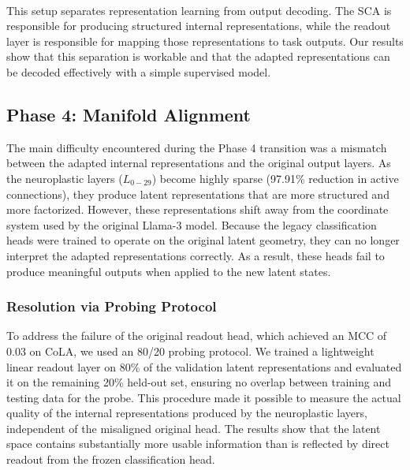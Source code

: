 \documentclass[11pt, letterpaper]{article}
\begin{document}
\paragraph{}
This setup separates representation learning from output decoding. The SCA is responsible for producing structured internal representations, while the readout layer is responsible for mapping those representations to task outputs. Our results show that this separation is workable and that the adapted representations can be decoded effectively with a simple supervised model.

\subsection{Phase 4: Manifold Alignment}
The main difficulty encountered during the Phase 4 transition was a mismatch between the adapted internal representations and the original output layers. As the neuroplastic layers ($L_{0-29}$) become highly sparse (97.91\% reduction in active connections), they produce latent representations that are more structured and more factorized. However, these representations shift away from the coordinate system used by the original Llama-3 model.
Because the legacy classification heads were trained to operate on the original latent geometry, they can no longer interpret the adapted representations correctly. As a result, these heads fail to produce meaningful outputs when applied to the new latent states.

\subsubsection{Resolution via Probing Protocol}
To address the failure of the original readout head, which achieved an MCC of 0.03 on CoLA, we used an 80/20 probing protocol. We trained a lightweight linear readout layer on 80\% of the validation latent representations and evaluated it on the remaining 20\% held-out set, ensuring no overlap between training and testing data for the probe.
This procedure made it possible to measure the actual quality of the internal representations produced by the neuroplastic layers, independent of the misaligned original head. The results show that the latent space contains substantially more usable information than is reflected by direct readout from the frozen classification head.
\end{document}
